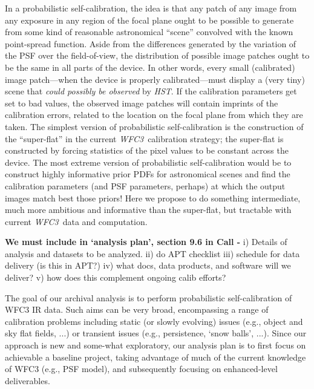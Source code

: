\documentclass[12pt]{article}
\newcommand{\project}[1]{\textsl{#1}}
\newcommand{\HST}{\project{HST}}
\newcommand{\WFC}{\project{WFC3}}
\begin{document}
In a probabilistic self-calibration, the idea is that any patch of any
image from any exposure in any region of the focal plane ought to be
possible to generate from some kind of reasonable astronomical
``scene'' convolved with the known point-spread function.  Aside from
the differences generated by the variation of the PSF over the
field-of-view, the distribution of possible image patches ought to be
the same in all parts of the device.  In other words, every small
(calibrated) image patch---when the device is properly
calibrated---must display a (very tiny) scene that \emph{could
  possibly be observed} by \HST.  If the calibration parameters get
set to bad values, the observed image patches will contain imprints of
the calibration errors, related to the location on the focal plane
from which they are taken.  The simplest version of probabilistic
self-calibration is the construction of the ``super-flat'' in the
current \WFC\ calibration strategy; the super-flat is constructed by
forcing statistics of the pixel values to be constant across the
device.  The most extreme version of probabilistic self-calibration
would be to construct highly informative prior PDFs for astronomical
scenes and find the calibration parameters (and PSF parameters,
perhaps) at which the output images match best those priors!  Here we
propose to do something intermediate, much more ambitious and
informative than the super-flat, but tractable with current \WFC\ data
and computation.

%
%
\describearchival       %


\textbf{We must include in `analysis plan', section 9.6 in Call -} 
i) Details of analysis and datasets to be analyzed.  ii) do APT
checklist iii) schedule for data delivery (is this in APT?) iv) what
docs, data products, and software will we deliver? v) how does this 
complement ongoing calib efforts?

The goal of our archival analysis is to perform probabilistic
self-calibration of WFC3 IR data.  Such aims can be very broad,
encompassing a range of calibration problems including static (or slowly 
evolving) issues (e.g., object and sky flat fields, ...) or transient
issues (e.g., persistence, `snow balls', ...).  Since our approach is
new and some-what exploratory, our analysis plan is to first focus on
achievable a baseline project, taking advantage of much of the current
knowledge of WFC3 (e.g., PSF model), and subsequently focusing on
enhanced-level deliverables.
\end{document}
